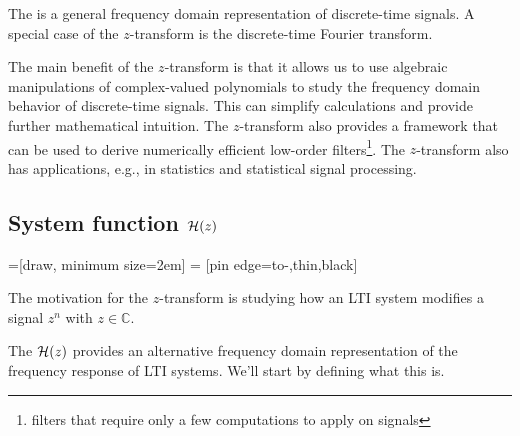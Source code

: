 The \emph{} is a general frequency
domain representation of discrete-time signals. A special case of the
$z$-transform is the discrete-time Fourier transform.

The main benefit of the $z$-transform is that it allows us to use
algebraic manipulations of complex-valued polynomials to study the
frequency domain behavior of discrete-time signals. This can simplify
calculations and provide further mathematical intuition. The
$z$-transform also provides a framework that can be used to derive
numerically efficient low-order filters\footnote{filters that require only a
  few computations to apply on signals}. The $z$-transform
also has applications, e.g., in statistics and statistical signal
processing.

\subsection{System function $\mathcal{H}(z)$}

=[draw, minimum size=2em]
 = [pin edge={to-,thin,black}]
\begin{marginfigure}
  \begin{center}
  \end{center}
  \caption{The motivation for the $z$-transform is studying how an LTI system modifies a signal $z^n$ with $z\in \mathbb{C}$.}
\end{marginfigure}

The \emph{} $\mathcal{H}(z)$ provides an
alternative frequency domain representation of the frequency response
of LTI systems. We'll start by defining what this is.

